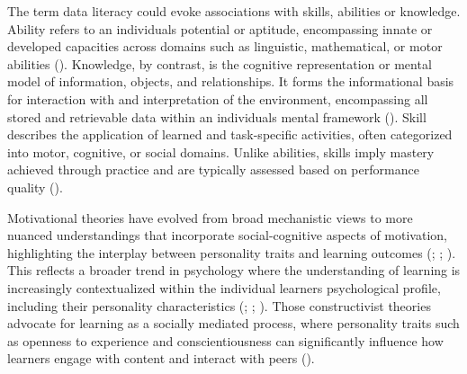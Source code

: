 \documentclass[
  12pt,
  a4paper,
  twoside]{article}
\begin{document}
The term data literacy could evoke associations with skills, abilities or knowledge.
Ability refers to an individuals potential or aptitude, encompassing innate or developed capacities across domains such as linguistic, mathematical, or motor abilities ().
Knowledge, by contrast, is the cognitive representation or mental model of information, objects, and relationships. It forms the informational basis for interaction with and interpretation of the environment, encompassing all stored and retrievable data within an individuals mental framework ().
Skill describes the application of learned and task-specific activities, often categorized into motor, cognitive, or social domains. Unlike abilities, skills imply mastery achieved through practice and are typically assessed based on performance quality ().

Motivational theories have evolved from broad mechanistic views to more nuanced understandings that incorporate social-cognitive aspects of motivation, highlighting the interplay between personality traits and learning outcomes (; ; ).
This reflects a broader trend in psychology where the understanding of learning is increasingly contextualized within the individual learners psychological profile, including their personality characteristics (; ; ).
Those constructivist theories advocate for learning as a socially mediated process, where personality traits such as openness to experience and conscientiousness can significantly influence how learners engage with content and interact with peers ().
\end{document}
